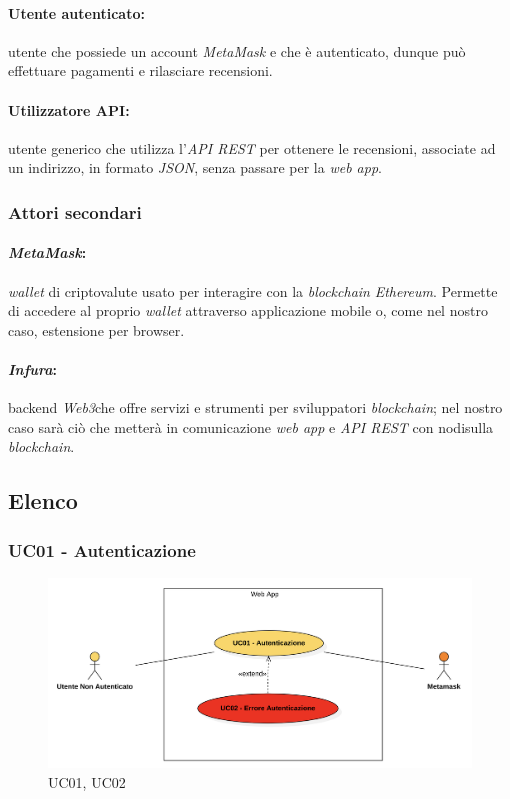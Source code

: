             \paragraph*{Utente autenticato:} utente che possiede un account \textit{MetaMask} e che è autenticato, dunque può effettuare pagamenti e rilasciare recensioni.

            \paragraph*{Utilizzatore API:} utente generico che utilizza l'\textit{API REST} per ottenere le recensioni, associate ad un indirizzo, in formato \textit{JSON}, senza passare per la \textit{web app}.

        \subsubsection{Attori secondari}
            \paragraph*{\textit{MetaMask}:} \textit{wallet}\glo \: di criptovalute usato per interagire con la \textit{blockchain} \textit{Ethereum}. Permette di accedere al proprio \textit{wallet} attraverso applicazione mobile o, come nel nostro caso, estensione per browser.

            \paragraph*{\textit{Infura}\glo:} backend \textit{Web3}\glo\:che offre servizi e strumenti per sviluppatori \textit{blockchain}; nel nostro caso sarà ciò che metterà in comunicazione \textit{web app} e \textit{API REST} con nodi\glo\:sulla \textit{blockchain}.

    \subsection{Elenco}

        \subsubsection{UC01 - Autenticazione}
        \label{UC01}

            \begin{figure}[H]
                \centering
                \includegraphics[scale=0.6]{src/img/UC01.png}
                \caption{UC01, UC02}
            \end{figure}

